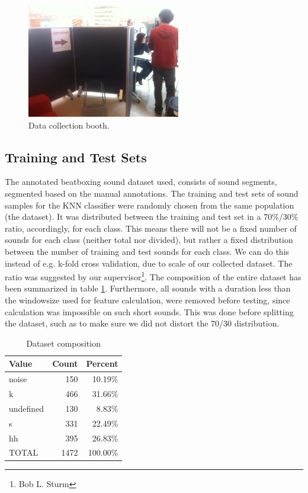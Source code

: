 	\begin{figure}[h]
		\begin{center}
			\includegraphics[height=5cm]{dataset_collection.JPG}
			\caption{Data collection booth.}
			\label{data-collection-pic}
		\end{center}
	\end{figure}
	
	
	\subsection{Training and Test Sets}
		The annotated beatboxing sound dataset used, consists of sound segments, segmented based on the manual annotations. The training and test sets of sound samples for the KNN classifier were randomly chosen from the same population (the dataset). It was distributed between the training and test set in a 70\%/30\% ratio, accordingly, for each class. This means there will not be a fixed number of sounds for each class (neither total nor divided), but rather a fixed distribution between the number of training and test sounds for each class. We can do this instead of e.g. k-fold cross validation, due to scale of our collected dataset. The ratio was suggested by our supervisor\footnote{Bob L. Sturm}. The composition of the entire dataset has been summarized in table \ref{table:eval:datasetComposition}. 
		Furthermore, all sounds with a duration less than the windowsize used for feature calculation, were removed before testing, since calculation was impossible on such short sounds. This was done before splitting the dataset, such as to make sure we did not distort the 70/30 distribution.

		\begin{table}
			\centering
			\begin{tabular}{|l|r|r|}
					\hline
					Value  &  Count  & Percent \\ \hline
			      noise    &  150    & 10.19\% \\ \hline
			          k    &  466    & 31.66\% \\ \hline
			  undefined    &  130    &  8.83\% \\ \hline
			          s    &  331    & 22.49\% \\ \hline
			         hh    &  395    & 26.83\% \\ \hline
			      TOTAL    &  1472	 & 100.00\% \\ \hline

			\end{tabular}
			\caption{Dataset composition}
			\label{table:eval:datasetComposition}
		\end{table}	
			
